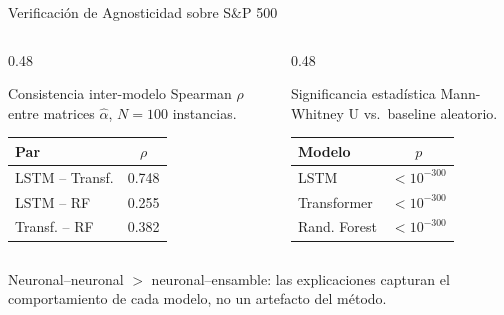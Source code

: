 \documentclass{beamer}
\begin{document}
\begin{frame}{Verificación de Agnosticidad sobre S\&P 500}
    \begin{columns}
        \begin{column}{0.48\textwidth}
            \begin{block}{Consistencia inter-modelo}
                Spearman $\rho$ entre matrices $\hat{\alpha}$,
                $N=100$ instancias.
                \vspace{0.2cm}
                \begin{tabular}{lc}
                    \toprule
                    \textbf{Par} & \textbf{$\rho$} \\
                    \midrule
                    LSTM -- Transf. & 0.748 \\
                    LSTM -- RF      & 0.255 \\
                    Transf. -- RF   & 0.382 \\
                    \bottomrule
                \end{tabular}
            \end{block}
        \end{column}
        \begin{column}{0.48\textwidth}
            \begin{block}{Significancia estadística}
                Mann-Whitney U vs.\ baseline aleatorio.
                \vspace{0.2cm}
                \begin{tabular}{lc}
                    \toprule
                    \textbf{Modelo} & \textbf{$p$} \\
                    \midrule
                    LSTM        & $<10^{-300}$ \\
                    Transformer & $<10^{-300}$ \\
                    Rand. Forest & $<10^{-300}$ \\
                    \bottomrule
                \end{tabular}
            \end{block}
        \end{column}
    \end{columns}
    \vspace{0.3cm}
    \begin{center}
        Neuronal--neuronal $>$ neuronal--ensamble: las explicaciones
        capturan el comportamiento de cada modelo, no un artefacto
        del método.
    \end{center}
\end{frame}
\end{document}
